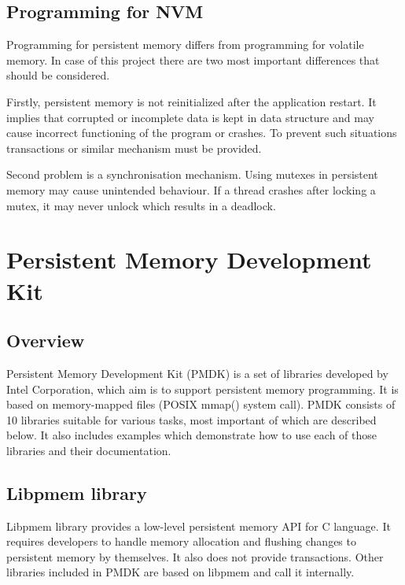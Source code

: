     \subsection{Programming for NVM}
        Programming for persistent memory differs from programming for volatile memory. 
        In case of this project there are two most important differences that should be considered.
        
        Firstly, persistent memory is not reinitialized after the application restart. 
        It implies that corrupted or incomplete data is kept in data structure and may cause incorrect functioning of the program or crashes. 
        To prevent such situations transactions or similar mechanism must be provided.
        
        Second problem is a synchronisation mechanism. 
        Using mutexes in persistent memory may cause unintended behaviour. 
        If a thread crashes after locking a mutex, it may never unlock which results in a deadlock. 
      
\section{Persistent Memory Development Kit}

    \subsection{Overview}
        Persistent Memory Development Kit (PMDK) \cite{PmemIo} is a set of libraries developed by Intel Corporation, which aim is to support persistent memory programming. 
        It is based on memory-mapped files (POSIX mmap() system call). 
        PMDK consists of 10 libraries suitable for various tasks, most important of which are described below. 
        It also includes examples which demonstrate how to use each of those libraries and their documentation.
        
    \subsection{Libpmem library}
        Libpmem library provides a low-level persistent memory API for C language. 
        It requires developers to handle memory allocation and flushing changes to persistent memory by themselves. 
        It also does not provide transactions.
        Other libraries included in PMDK are based on libpmem and call it internally.
    
